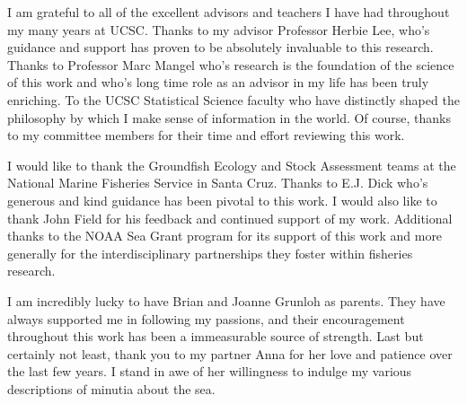 \documentclass[12pt]{ucscthesis}
\begin{document}
\begin{frontmatter}
\begin{acknowledgements}
%
I am grateful to all of the excellent advisors and teachers I have had throughout 
my many years at UCSC. Thanks to my advisor Professor Herbie Lee, who's guidance and 
support has proven to be absolutely invaluable to this research. %
Thanks to Professor Marc Mangel who's research is the foundation of the science of this work 
and who's long time role as an advisor in my life has been truly enriching. %
To the UCSC Statistical Science faculty who %
have distinctly shaped the philosophy by which I make sense of 
information in the world. Of course, thanks to my committee members for their time 
and effort reviewing this work. 

%
I would like to thank the Groundfish Ecology and Stock Assessment teams at the 
National Marine Fisheries Service in Santa Cruz. Thanks to E.J. Dick 
who's generous and kind guidance has been pivotal to this work. 
I would also like to thank John Field for his feedback %
and continued support of my work. Additional thanks to the NOAA Sea Grant 
program for its support of this work and more generally for the interdisciplinary partnerships 
they foster within fisheries research. 

%
I am incredibly lucky to have Brian and Joanne Grunloh as parents. 
They have always supported me in following my passions, and their encouragement 
throughout this work has been a immeasurable source of strength.
Last but certainly not least, thank you to my partner Anna for her love and patience 
over the last few years. 
I stand in awe of her willingness to indulge my various descriptions of minutia about the sea.




\end{acknowledgements}
\end{frontmatter}
\end{document}
